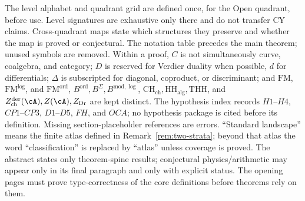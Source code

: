 \begin{convention}
The level alphabet and quadrant grid are defined once, for the Open
quadrant, before use.  Level signatures are exhaustive only there and
do not transfer CY claims.  Cross-quadrant maps state which structures
they preserve and whether the map is proved or conjectural.  The
notation table precedes the main theorem; unused symbols are removed.
Within a proof, \(C\) is not simultaneously curve, coalgebra, and
category; \(D\) is reserved for Verdier duality when possible, \(d\)
for differentials; \(\Delta\) is subscripted for diagonal,
coproduct, or discriminant; and
\(\mathrm{FM}\), \(\mathrm{FM}^{\log}\), and \(\mathrm{FM}^{\mathrm{ord}}\),
\(B^{\mathrm{ord}},B^\Sigma,B^{\mathrm{mod},\log}\),
\(\mathrm{CH}_{\mathrm{ch}},\mathrm{HH}_{\mathrm{alg}},\mathrm{THH}\),
and \(Z^{\mathrm{der}}_{\mathrm{ch}}(\cA),Z(\cA),Z_{\mathrm{Dr}}\)
are kept distinct.  The hypothesis index records \(H1\)--\(H4\),
\(CP1\)--\(CP3\), \(D1\)--\(D5\), \(FH\), and \(OCA\); no hypothesis
package is cited before its definition.  Missing section-placeholder
references are errors.  ``Standard landscape'' means the finite atlas defined in
Remark~\ref{rem:two-strata}; beyond that atlas the word
``classification'' is replaced by ``atlas'' unless coverage is proved.
The abstract states only theorem-spine results; conjectural
physics/arithmetic may appear only in its final paragraph and only
with explicit status.  The opening pages must prove type-correctness of
the core definitions before theorems rely on them.
\end{convention}
